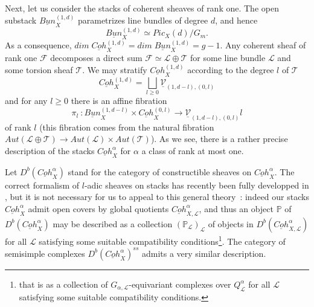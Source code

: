 \documentclass[a4paper,10pt]{amsart}
\def\a{\alpha}
\numberwithin{equation}{section}
\begin{document}
Next, let us consider the stacks of coherent sheaves of rank one. The open substack $\underline{Bun}^{(1,d)}_X$ parametrizes line bundles of degree $d$, and hence
$$\underline{Bun}^{(1,d)}_X \simeq Pic_X(d)/G_m.$$
As a consequence, $dim\;\underline{Coh}^{(1,d)}_X=dim\;\underline{Bun}^{(1,d)}_X=g-1$.
Any coherent sheaf of rank one $\mathcal{F}$ decomposes a direct sum $\mathcal{F} \simeq \mathcal{L} \oplus \mathcal{T}$ for some line bundle $\mathcal{L}$ and some torsion sheaf $\mathcal{T}$. We may stratify $\underline{Coh}_X^{(1,d)}$ according to the degree $l$ of $\mathcal{T}$
\begin{equation}\label{E:strat0}
\underline{Coh}^{(1,d)}_X=\bigsqcup_{l \geq 0} \underline{\mathcal{V}}_{(1,d-l),(0,l)}
\end{equation}
and for any $l \geq 0$ there is an affine fibration
$$\pi_l~:\underline{Bun}^{(1,d-l)}_X \times \underline{Coh}^{(0,l)}_X \to \underline{\mathcal{V}}_{(1,d-l),(0,l)}l$$ of rank $l$ (this fibration comes from the natural fibration $Aut(\mathcal{L} \oplus \mathcal{T}) \to Aut(\mathcal{L}) \times Aut(\mathcal{T})$). As we see, there is a rather precise description of the stacks $\underline{Coh}^{\a}_X$ for $\a$ a class of rank at most one.

\vspace{.2in}

Let $D^b(\underline{Coh}^{\a}_X)$ stand for the category of constructible sheaves on $\underline{Coh}^{\a}_X$. The correct formalism of $l$-adic sheaves on stacks has recently been fully developped in \cite{Olsson-Laszlo}, but it is not necessary for us to appeal to this general theory~: indeed our stacks $\underline{Coh}^{\a}_X$ admit open covers by global quotients $\underline{Coh}^{\a}_{X,\mathcal{L}}$, and thus an object $\mathbb{P}$ of $D^b(\underline{Coh}^{\a}_X)$ may be  described as a collection $(\mathbb{P}_{\mathcal{L}})_{\mathcal{L}}$ of objects in $D^b(\underline{Coh}^{\a}_{X,\mathcal{L}})$ for all $\mathcal{L}$ satisfying some suitable compatibility conditions\footnote{that is as a collection of $G_{\a,\mathcal{L}}$-equivariant complexes over $Q^{\a}_{\mathcal{L}}$ for all $\mathcal{L}$ satisfying some suitable compatibility conditions.}. The category of semisimple complexes $D^b(\underline{Coh}^{\a}_X)^{ss}$ admits a very similar description. 

\vspace{.2in}
\end{document}
